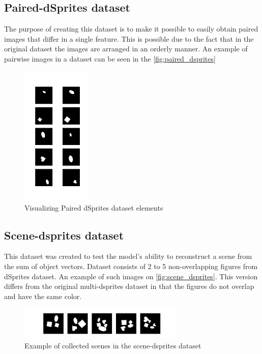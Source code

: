 \documentclass{article}
\begin{document}
    \subsection{Paired-dSprites dataset}

    The purpose of creating this dataset is to make it possible to easily
    obtain paired images that differ in a single feature. This is possible
    due to the fact that in the original dataset the images are arranged in
    an orderly manner.
    An example of pairwise images in a dataset can be seen in the
    \autoref{fig:paired_dsprites}
    \begin{figure}[ht]
        \centering
        \includegraphics[width=0.3\textwidth]{img/datasets/paired_dsprites}
        \caption{Visualizing Paired dSprites dataset elements}
        \label{fig:paired_dsprites}
    \end{figure}

    \subsection{Scene-dsprites dataset}

    This dataset was created to test the model's ability to reconstruct
    a scene from the sum of object vectors.
    Dataset consists of 2 to 5 non-overlapping figures from dSprites dataset.
    An example of such images on \autoref{fig:scene_dsprites}. This version differs from
    the original multi-dsprites dataset in that the figures do not overlap
    and have the same color.

    \begin{figure}[ht]
        \centering
        \includegraphics[width=0.7\textwidth]{img/datasets/scene-dsprites}
        \caption{Example of collected scenes in the scene-dsprites dataset}
        \label{fig:scene_dsprites}
    \end{figure}
\end{document}
